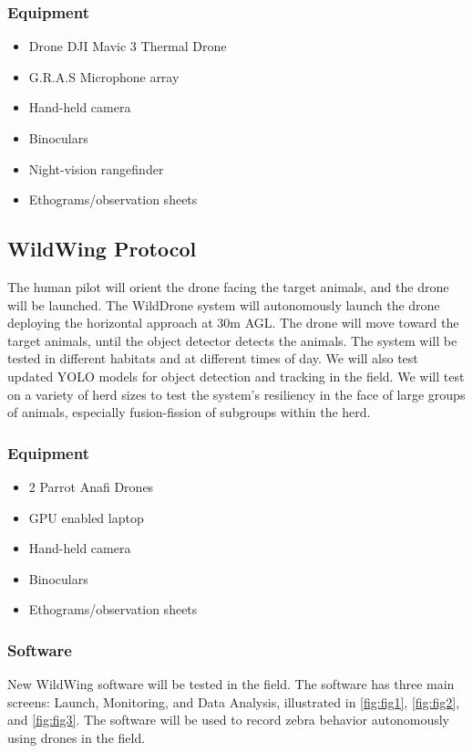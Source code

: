 \documentclass[final,5p,times,twocolumn]{elsarticle}
\begin{document}
\subsubsection{Equipment}
\begin{itemize}
    \item Drone DJI Mavic 3 Thermal Drone
    \item G.R.A.S Microphone array
    \item Hand-held camera
    \item Binoculars
    \item Night-vision rangefinder
    \item Ethograms/observation sheets
\end{itemize}


\subsection{WildWing Protocol}
The human pilot will orient the drone facing the target animals, and the drone will be launched.
The WildDrone system will autonomously launch the drone deploying the horizontal approach at 30m AGL.
The drone will move toward the target animals, until the object detector detects the animals.
The system will be tested in different habitats and at different times of day.
We will also test updated YOLO models for object detection and tracking in the field.
We will test on a variety of herd sizes to test the system's resiliency in the face of large groups of animals,
especially fusion-fission of subgroups within the herd.

\subsubsection{Equipment}
\begin{itemize}
    \item 2 Parrot Anafi Drones
    \item GPU enabled laptop
    \item Hand-held camera
    \item Binoculars
    \item Ethograms/observation sheets
\end{itemize}

\subsubsection{Software}
New WildWing software will be tested in the field. The software has three main screens: 
Launch, Monitoring, and Data Analysis, illustrated in 
\cref{fig:fig1}, \cref{fig:fig2}, and \cref{fig:fig3}.
The software will be used to record zebra behavior autonomously using drones in the field.
\end{document}
